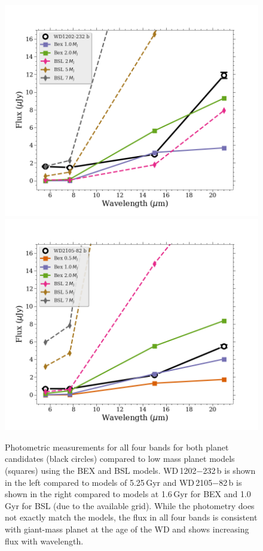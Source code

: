 \documentclass[twocolumn]{aastex631}
\newcommand{\wdA}{WD\,1202$-$232}
\newcommand{\wdB}{WD\,2105$-$82}
\begin{document}
\begin{figure}
\centering
\includegraphics[scale=0.27]{wd1202_sed_model_v6.png}
\includegraphics[scale=0.27]{wd2105_sed_model_v6.png}
\caption{Photometric measurements for all four bands for both planet candidates (black circles) compared to low mass planet models  (squares) using the BEX \citep{Linder2019} and BSL \citep{Burrows2003} models.  \wdA\,b is shown in the left compared to models of 5.25\,Gyr and \wdB\,b is shown in the right compared to models at 1.6\,Gyr for BEX and 1.0\,Gyr for BSL (due to the available grid). While the photometry does not exactly match the models, the flux in all four bands is consistent with giant-mass planet at the age of the WD and shows increasing flux with wavelength.}
\label{fig:sed}
\end{figure}
\end{document}
